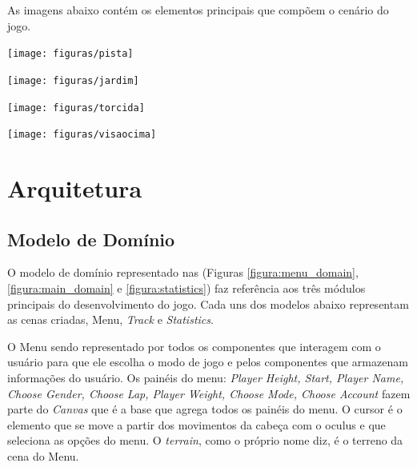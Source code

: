 As imagens abaixo contém os elementos principais que compõem o cenário do jogo.

\begin{center}
	\texttt{[image: figuras/pista]}
	\label{figura:pista}
\end{center}

\begin{center}
	\texttt{[image: figuras/jardim]}
	\label{figura:jardim}
\end{center}


\begin{center}
	\texttt{[image: figuras/torcida]}
	\label{figura:torcida}
\end{center}

\begin{center}
	\texttt{[image: figuras/visaocima]}
	\label{figura:visaodecima}
\end{center}

\section{Arquitetura}

\subsection{Modelo de Domínio}

O modelo de domínio representado nas (Figuras \ref{figura:menu_domain}, \ref{figura:main_domain} e \ref{figura:statistics}) faz referência aos três módulos principais do desenvolvimento do jogo. Cada uns dos modelos abaixo representam as cenas criadas, Menu, \textit{Track} e \textit{Statistics}.

O Menu sendo representado por todos os componentes que interagem com o usuário para que ele escolha o modo de jogo e pelos componentes que armazenam informações do usuário. Os painéis do menu: \textit{Player Height, Start, Player Name, Choose Gender, Choose Lap, Player Weight, Choose Mode, Choose Account} fazem parte do \textit{Canvas} que é a base que agrega todos os painéis do menu. O cursor é o elemento que se move a partir dos movimentos da cabeça com o oculus e que seleciona as opções do menu. O \textit{terrain}, como o próprio nome diz, é o terreno da cena do Menu.

